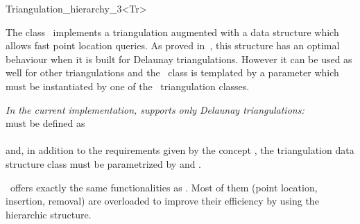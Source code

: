 

\begin{ccRefClass}{Triangulation_hierarchy_3<Tr>}

\ccDefinition
The class \ccRefName\ implements a triangulation augmented with
a data structure which allows fast point location queries.
As proved in~\cite{d-iirdt-98}, this structure has an optimal behaviour
when it is built for Delaunay triangulations.
However it can be used as well for other triangulations
and the \ccRefName\ class is templated by a parameter
which must be instantiated by one of the \cgal\ triangulation
classes.

\textit{In the current implementation,  
supports only Delaunay triangulations:}\\
 must be defined as\\
\\
and, in addition to the requirements given by the concept
, the triangulation data structure
class must be parametrized by 
and .


\ccInheritsFrom


\ccRefName\ offers exactly the same functionalities as .
Most of them (point location, insertion, removal) are overloaded to
improve their efficiency by using the hierarchic structure. 





\end{ccRefClass}
